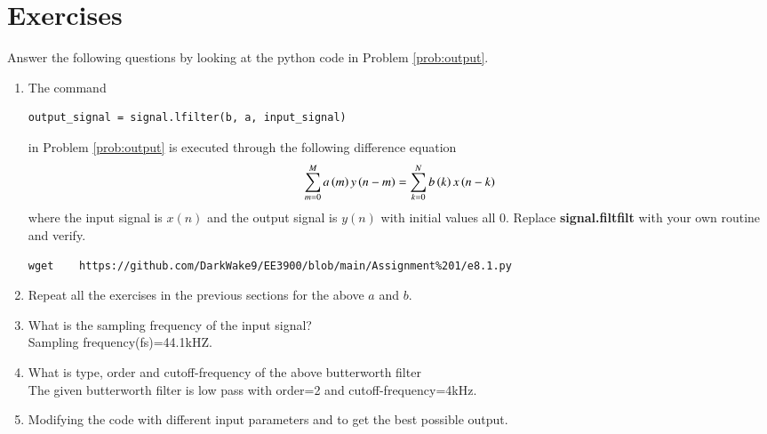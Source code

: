 \documentclass[journal,12pt,twocolumn]{IEEEtran}
\renewcommand\thesection{\arabic{section}}
\begin{document}
\section{Exercises}
Answer the following questions by looking at the python code in Problem \ref{prob:output}.
\begin{enumerate}[label=\thesection.\arabic*]
\item
The command
\begin{lstlisting}
output_signal = signal.lfilter(b, a, input_signal)
\end{lstlisting}
in Problem \ref{prob:output} is executed through the following difference equation
\begin{equation}
	\label{eq:iir_filter_gen}
	\sum _{m=0}^{M}a\left(m\right)y\left(n-m\right)=\sum _{k=0}^{N}b\left(k\right)x\left(n-k\right)
\end{equation}
%
where the input signal is $x(n)$ and the output signal is $y(n)$ with initial values all 0. Replace
\textbf{signal.filtfilt} with your own routine and verify.\\
\solution
\begin{lstlisting}
wget	https://github.com/DarkWake9/EE3900/blob/main/Assignment%201/e8.1.py
\end{lstlisting}
\item Repeat all the exercises in the previous sections for the above $a$ and $b$.
\item What is the sampling frequency of the input signal?
\\
\solution
Sampling frequency(fs)=44.1kHZ.
\item
What is type, order and  cutoff-frequency of the above butterworth filter
\\
\solution
The given butterworth filter is low pass with order=2 and cutoff-frequency=4kHz.
%
\item
Modifying the code with different input parameters and to get the best possible output.
%
\end{enumerate}
\end{document}
